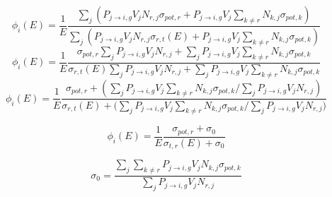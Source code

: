 \documentclass{beamer}
\begin{document}
    \begin{frame}
\begin{equation*}\phi_{i}(E)=\frac{1}{E}\frac{\sum\limits_j\left(P_{j\rightarrow i,g}V_{j}N_{r,j}\sigma_{pot,r}+P_{j\rightarrow i,g}V_{j}\sum\limits_{k\neq r}N_{k,j}\sigma_{pot,k}\right)}{\sum\limits_{j}\left(P_{j\rightarrow i,g}V_{j}N_{r,j}\sigma_{r,t}(E)+P_{j\rightarrow i,g}V_{j}\sum\limits_{k\neq r}N_{k,j}\sigma_{pot,k}\right)}\end{equation*}
\begin{equation*}\phi_{i}(E)=\frac{1}{E}\frac{\sigma_{pot,r}\sum\limits_jP_{j\rightarrow i,g}V_{j}N_{r,j}+\sum\limits_jP_{j\rightarrow i,g}V_{j}\sum\limits_{k\neq r}N_{k,j}\sigma_{pot,k}}{\sigma_{r,t}(E)\sum\limits_{j}P_{j\rightarrow i,g}V_{j}N_{r,j}+\sum\limits_{j}P_{j\rightarrow i,g}V_{j}\sum\limits_{k\neq r}N_{k,j}\sigma_{pot,k}}\end{equation*}
\begin{equation*}\phi_{i}(E)=\frac{1}{E}\frac{\sigma_{pot,r}+\left(\sum\limits_jP_{j\rightarrow i,g}V_{j}\sum\limits_{k\neq r}N_{k,j}\sigma_{pot,k}\Big/\sum\limits_jP_{j\rightarrow i,g}V_{j}N_{r,j}\right)}{\sigma_{r,t}(E)+\Big(\sum\limits_{j}P_{j\rightarrow i,g}V_{j}\sum\limits_{k\neq r}N_{k,j}\sigma_{pot,k}\Big/\sum\limits_{j}P_{j\rightarrow i,g}V_{j}N_{r,j}\Big)}\end{equation*}



    \end{frame}



    \begin{frame}


\begin{equation*}\phi_i(E)=\frac{1}{E}\frac{\sigma_{pot,r}+\sigma_{0}}{\sigma_{t,r}(E)+\sigma_{0}}\end{equation*}


\begin{equation*}\sigma_{0}=\frac{\sum\limits_j\sum\limits_{k\neq r}P_{j\rightarrow i,g}V_{j}N_{k,j}\sigma_{pot,k}}{\sum\limits_jP_{j\rightarrow i,g}V_{j}N_{r,j}}\end{equation*}




\end{frame}
\end{document}
